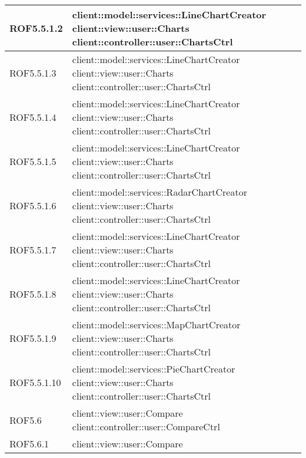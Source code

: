 \begin{center}
\begin{longtable}{| p{2.5cm} | p{11cm} |}
\hline
ROF5.5.1.2 & client::model::services::LineChartCreator \newline client::view::user::Charts \newline client::controller::user::ChartsCtrl \\
\hline
ROF5.5.1.3 & client::model::services::LineChartCreator \newline client::view::user::Charts \newline client::controller::user::ChartsCtrl \\
\hline
ROF5.5.1.4 & client::model::services::LineChartCreator \newline client::view::user::Charts \newline client::controller::user::ChartsCtrl \\
\hline
ROF5.5.1.5 & client::model::services::LineChartCreator \newline client::view::user::Charts \newline client::controller::user::ChartsCtrl \\
\hline
ROF5.5.1.6 & client::model::services::RadarChartCreator \newline client::view::user::Charts \newline client::controller::user::ChartsCtrl \\
\hline
ROF5.5.1.7 & client::model::services::LineChartCreator \newline client::view::user::Charts \newline client::controller::user::ChartsCtrl \\
\hline
ROF5.5.1.8 & client::model::services::LineChartCreator \newline client::view::user::Charts \newline client::controller::user::ChartsCtrl \\
\hline
ROF5.5.1.9 & client::model::services::MapChartCreator \newline client::view::user::Charts \newline client::controller::user::ChartsCtrl \\
\hline
ROF5.5.1.10 & client::model::services::PieChartCreator \newline client::view::user::Charts \newline client::controller::user::ChartsCtrl \\
\hline
ROF5.6 & client::view::user::Compare \newline client::controller::user::CompareCtrl \\
\hline
ROF5.6.1 & client::view::user::Compare \\

\end{longtable}
\end{center}
